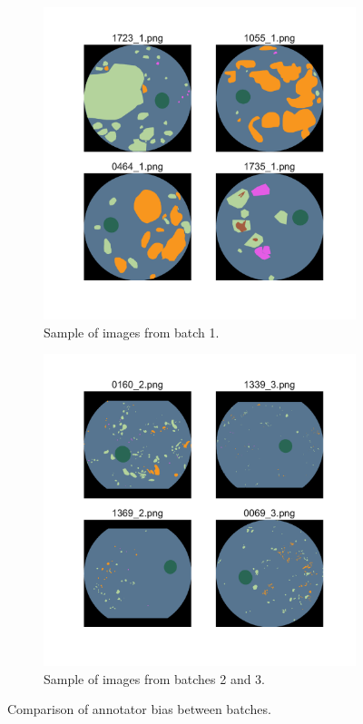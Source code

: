 \begin{figure}[h]
    \centering
    \begin{subfigure}{0.45\textwidth}
        \centering
        \includegraphics[width=\linewidth]{datasets/figs/fgadr_bad_sample.pdf}
        \caption{Sample of images from batch 1.}
        \label{fig:fgadr_bad_sample}
    \end{subfigure} %
    \begin{subfigure}{0.45\textwidth}
        \centering
        \includegraphics[width=\linewidth]{datasets/figs/fgadr_good_sample.pdf}
        \caption{Sample of images from batches 2 and 3.}
        \label{fig:fgadr_good_sample}
    \end{subfigure}
    \caption{Comparison of annotator bias between batches.}
    \label{fig:fgadr_good_bad}
\end{figure}

